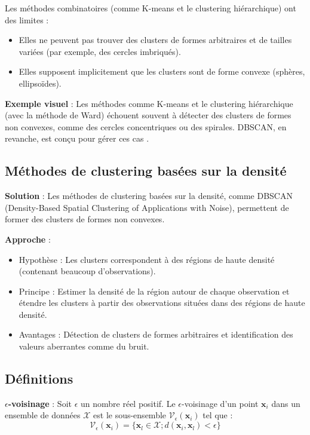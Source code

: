 \documentclass[10pt,a4paper]{article}
\begin{document}
Les méthodes combinatoires (comme K-means et le clustering hiérarchique) ont des limites :
\begin{itemize}
    \item Elles ne peuvent pas trouver des clusters de formes arbitraires et de tailles variées (par exemple, des cercles imbriqués).
    \item Elles supposent implicitement que les clusters sont de forme convexe (sphères, ellipsoïdes).
\end{itemize}

\textbf{Exemple visuel} :
Les méthodes comme K-means et le clustering hiérarchique (avec la méthode de Ward) échouent souvent à détecter des clusters de formes non convexes, comme des cercles concentriques ou des spirales. DBSCAN, en revanche, est conçu pour gérer ces cas \cite{dbscan-scikit-learn, dbscan-wikipedia}.

\subsection*{Méthodes de clustering basées sur la densité}

\textbf{Solution} : Les méthodes de clustering basées sur la densité, comme DBSCAN (Density-Based Spatial Clustering of Applications with Noise), permettent de former des clusters de formes non convexes.

\textbf{Approche} :
\begin{itemize}
    \item Hypothèse : Les clusters correspondent à des régions de haute densité (contenant beaucoup d'observations).
    \item Principe : Estimer la densité de la région autour de chaque observation et étendre les clusters à partir des observations situées dans des régions de haute densité.
    \item Avantages : Détection de clusters de formes arbitraires et identification des valeurs aberrantes comme du bruit.
\end{itemize}

\subsection*{Définitions}

\textbf{$\epsilon$-voisinage} :
Soit $\epsilon$ un nombre réel positif. Le $\epsilon$-voisinage d'un point $\mathbf{x}_i$ dans un ensemble de données $\mathcal{X}$ est le sous-ensemble $\mathcal{V}_{\epsilon}(\mathbf{x}_i)$ tel que :
$$\mathcal{V}_{\epsilon}(\mathbf{x}_i) = \{\mathbf{x}_l \in \mathcal{X} ; d(\mathbf{x}_i, \mathbf{x}_l) < \epsilon\}$$
\end{document}
